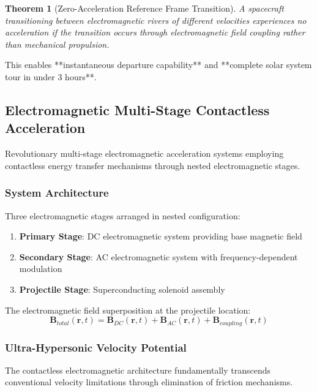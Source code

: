 \documentclass[12pt,a4paper]{article}
\newtheorem{theorem}{Theorem}[section]
\theoremstyle{remark}
\begin{document}
\begin{theorem}[Zero-Acceleration Reference Frame Transition]
A spacecraft transitioning between electromagnetic rivers of different velocities experiences no acceleration if the transition occurs through electromagnetic field coupling rather than mechanical propulsion.
\end{theorem}

This enables **instantaneous departure capability** and **complete solar system tour in under 3 hours**.

\subsection{Electromagnetic Multi-Stage Contactless Acceleration}

Revolutionary multi-stage electromagnetic acceleration systems employing contactless energy transfer mechanisms through nested electromagnetic stages.

\subsubsection{System Architecture}

Three electromagnetic stages arranged in nested configuration:
\begin{enumerate}
\item \textbf{Primary Stage}: DC electromagnetic system providing base magnetic field
\item \textbf{Secondary Stage}: AC electromagnetic system with frequency-dependent modulation
\item \textbf{Projectile Stage}: Superconducting solenoid assembly
\end{enumerate}

The electromagnetic field superposition at the projectile location:
\begin{equation}
\mathbf{B}_{total}(\mathbf{r},t) = \mathbf{B}_{DC}(\mathbf{r},t) + \mathbf{B}_{AC}(\mathbf{r},t) + \mathbf{B}_{coupling}(\mathbf{r},t)
\end{equation}

\subsubsection{Ultra-Hypersonic Velocity Potential}

The contactless electromagnetic architecture fundamentally transcends conventional velocity limitations through elimination of friction mechanisms.
\end{document}

